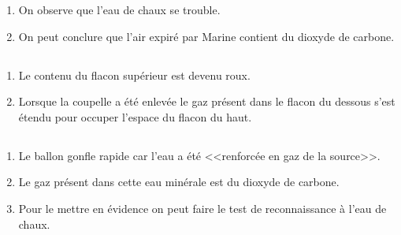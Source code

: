 \documentclass[12pt,a4paper]{article}
\begin{document}
\begin{enumerate}[label=\alph*)]
	\item On observe que l'eau de chaux se trouble.
	\item On peut conclure que l'air expiré par Marine contient du dioxyde de carbone.
\end{enumerate}

\subsection*{}
\begin{enumerate}[label=\alph*)]
	\item Le contenu du flacon supérieur est devenu roux.
	\item Lorsque la coupelle a été enlevée le gaz présent dans le flacon du dessous s'est étendu pour occuper l'espace du flacon du haut.
\end{enumerate}

\subsection*{}
\begin{enumerate}[label=\alph*)]
	\item Le ballon gonfle rapide car l'eau a été <<renforcée en gaz de la source>>.
	\item Le gaz présent dans cette eau minérale est du dioxyde de carbone.
	\item Pour le mettre en évidence on peut faire le test de reconnaissance à l'eau de chaux.
\end{enumerate}
\end{document}
